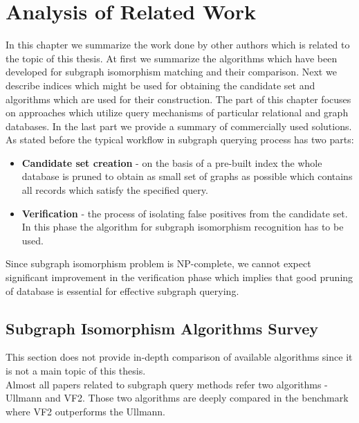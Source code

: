 \chapter{Analysis of Related Work}

In this chapter we summarize the work done by other authors which is related to the topic of this thesis. At first we summarize the algorithms which have been developed for subgraph isomorphism matching and their comparison. Next we describe indices which might be used for obtaining the candidate set and algorithms which are used for their construction. The part of this chapter focuses on approaches which utilize query mechanisms of particular relational and graph databases. In the last part we provide a summary of commercially used solutions.\\

As stated before the typical workflow in subgraph querying process has two parts:

\begin{itemize}
	\item \textbf{Candidate set creation} - on the basis of a pre-built index the whole \linebreak database is pruned to obtain as small set of graphs as possible which contains all records which satisfy the specified query.
	
	\item \textbf{Verification} - the process of isolating false positives from the candidate set. In this phase the algorithm for subgraph isomorphism recognition has to be used.
	
\end{itemize}

Since subgraph isomorphism problem is NP-complete, we cannot expect significant improvement in the verification phase which implies that good pruning of database is essential for effective subgraph querying.



\section{Subgraph Isomorphism Algorithms Survey}

This section does not provide in-depth comparison of available algorithms since it is not a main topic of this thesis.\\

Almost all papers related to subgraph query methods refer two algorithms - Ullmann\cite{Ullmann} and VF2\cite{VF2}. Those two algorithms are deeply compared in the \cite{Ehrlich2012} benchmark where VF2 outperforms the Ullmann.\\

